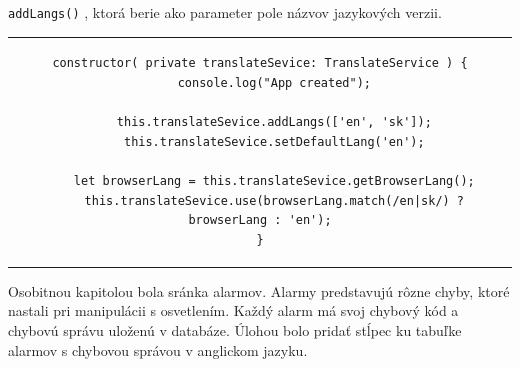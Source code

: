 \documentclass[11pt, oneside]{report}
\begin{document}
\lstinline!addLangs()! , ktorá berie ako parameter pole názvov jazykových verzii.
\begin{center}
\begin{tabular}{c}
\lstset{language=JavaScript}
\begin{lstlisting}[showstringspaces=false, caption=Konštruktor  aplikácie,captionpos=b]
constructor( private translateSevice: TranslateService ) {
    console.log("App created");
	
    this.translateSevice.addLangs(['en', 'sk']);
    this.translateSevice.setDefaultLang('en');
	
    let browserLang = this.translateSevice.getBrowserLang();
    this.translateSevice.use(browserLang.match(/en|sk/) ? browserLang : 'en');
}
\end{lstlisting}
\end{tabular}
\end{center}
Osobitnou kapitolou bola sránka alarmov. Alarmy predstavujú  rôzne chyby, ktoré nastali pri manipulácii s osvetlením. Každý alarm má svoj chybový kód a  chybovú správu uloženú v databáze. Úlohou bolo  pridať stĺpec ku tabuľke alarmov  s chybovou  správou v anglickom jazyku.
\end{document}
